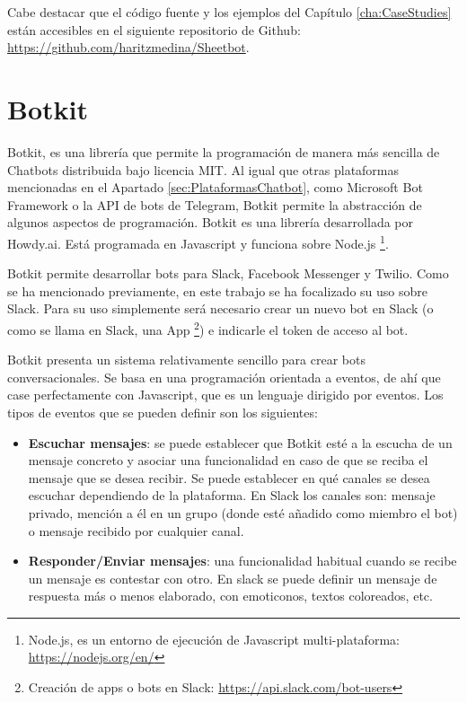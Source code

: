 Cabe destacar que el código fuente y los ejemplos del Capítulo \ref{cha:CaseStudies} están accesibles en el siguiente repositorio de Github: \url{https://github.com/haritzmedina/Sheetbot}.


\section{Botkit}
\label{sec:Botkit}

Botkit, es una librería que permite la programación de manera más sencilla de Chatbots distribuida bajo licencia MIT. Al igual que otras plataformas mencionadas en el Apartado \ref{sec:PlataformasChatbot}, como Microsoft Bot Framework o la API de bots de Telegram, Botkit permite la abstracción de algunos aspectos de programación. Botkit es una librería desarrollada por Howdy.ai. Está programada en Javascript y funciona sobre Node.js \footnote{Node.js, es un entorno de ejecución de Javascript multi-plataforma: \url{https://nodejs.org/en/}}.

Botkit permite desarrollar bots para Slack, Facebook Messenger y Twilio. Como se ha mencionado previamente, en este trabajo se ha focalizado su uso sobre Slack. Para su uso simplemente será necesario crear un nuevo bot en Slack (o como se llama en Slack, una App \footnote{Creación de apps o bots en Slack: \url{https://api.slack.com/bot-users}}) e indicarle el token de acceso al bot.

Botkit presenta un sistema relativamente sencillo para crear bots conversacionales. Se basa en una programación orientada a eventos, de ahí que case perfectamente con Javascript, que es un lenguaje dirigido por eventos. Los tipos de eventos que se pueden definir son los siguientes:
\begin{itemize}
	\item \textbf{Escuchar mensajes}: se puede establecer que Botkit esté a la escucha de un mensaje concreto y asociar una funcionalidad en caso de que se reciba el mensaje que se desea recibir. Se puede establecer en qué canales se desea escuchar dependiendo de la plataforma. En Slack los canales son: mensaje privado, mención a él en un grupo (donde esté añadido como miembro el bot) o mensaje recibido por cualquier canal.
	\item \textbf{Responder/Enviar mensajes}: una funcionalidad habitual cuando se recibe un mensaje es contestar con otro. En slack se puede definir un mensaje de respuesta más o menos elaborado, con emoticonos, textos coloreados, etc.
\end{itemize}

